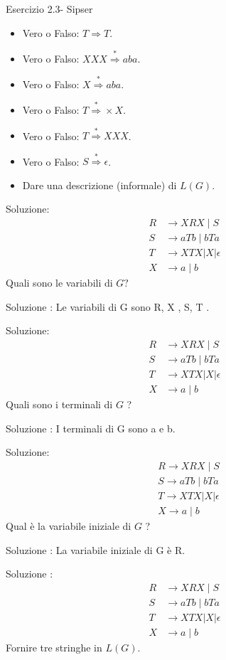 Esercizio 2.3- Sipser
\begin{itemize}
    \item Vero o Falso: $T \Rightarrow T$.
\item Vero o Falso: $X X X \stackrel{*}{\Rightarrow} a b a .$
\item Vero o Falso: $X \stackrel{*}{\Rightarrow} a b a .$
\item Vero o Falso: $T \stackrel{*}{\Rightarrow} \times X$.
\item Vero o Falso: $T \stackrel{*}{\Rightarrow} X X X$.
\item Vero o Falso: $S \stackrel{*}{\Rightarrow} \epsilon$.
\item Dare una descrizione (informale) di $L(G)$.
\end{itemize}
Soluzione:
$$
\begin{aligned}
R & \rightarrow X R X \mid S \\
S & \rightarrow a T b \mid b T a \\
T & \rightarrow X T X|X| \epsilon \\
X & \rightarrow a \mid b
\end{aligned}
$$
Quali sono le variabili di $G ?$

Soluzione :
Le variabili di G sono R, X , S, T .

Soluzione:
$$
\begin{aligned}
R & \rightarrow X R X \mid S \\
S & \rightarrow a T b \mid b T a \\
T & \rightarrow X T X|X| \epsilon \\
X & \rightarrow a \mid b
\end{aligned}
$$
Quali sono i terminali di $G$ ?

Soluzione :
I terminali di G sono a e b.

Soluzione:
$$
\begin{aligned}
&R \rightarrow X R X \mid S \\
&S \rightarrow a T b \mid b T a \\
&T \rightarrow X T X|X| \epsilon \\
&X \rightarrow a \mid b
\end{aligned}
$$
Qual è la variabile iniziale di $G$ ?

Soluzione :
La variabile iniziale di G è R.

Soluzione :
$$
\begin{aligned}
R & \rightarrow X R X \mid S \\
S & \rightarrow a T b \mid b T a \\
T & \rightarrow X T X|X| \epsilon \\
X & \rightarrow a \mid b
\end{aligned}
$$
Fornire tre stringhe in $L(G)$.

